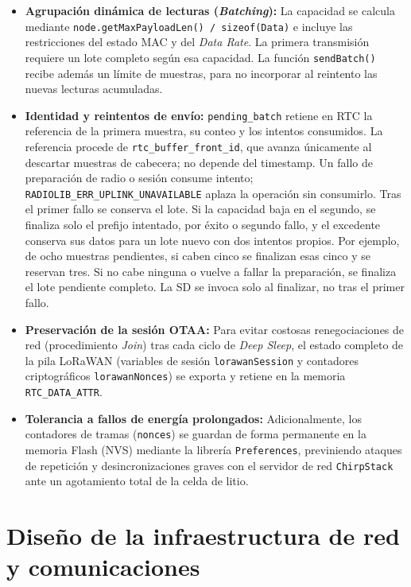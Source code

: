 \begin{itemize}
    \item \textbf{Agrupación dinámica de lecturas (\textit{Batching}):} La capacidad se calcula mediante \texttt{node.getMaxPayloadLen() / sizeof(Data)} e incluye las restricciones del estado MAC y del \textit{Data Rate}. La primera transmisión requiere un lote completo según esa capacidad. La función \texttt{sendBatch()} recibe además un límite de muestras, para no incorporar al reintento las nuevas lecturas acumuladas.
    \item \textbf{Identidad y reintentos de envío:} \texttt{pending\_batch} retiene en RTC la referencia de la primera muestra, su conteo y los intentos consumidos. La referencia procede de \texttt{rtc\_buffer\_front\_id}, que avanza únicamente al descartar muestras de cabecera; no depende del timestamp. Un fallo de preparación de radio o sesión consume intento; \texttt{RADIOLIB\_ERR\_UPLINK\_UNAVAILABLE} aplaza la operación sin consumirlo. Tras el primer fallo se conserva el lote. Si la capacidad baja en el segundo, se finaliza solo el prefijo intentado, por éxito o segundo fallo, y el excedente conserva sus datos para un lote nuevo con dos intentos propios. Por ejemplo, de ocho muestras pendientes, si caben cinco se finalizan esas cinco y se reservan tres. Si no cabe ninguna o vuelve a fallar la preparación, se finaliza el lote pendiente completo. La SD se invoca solo al finalizar, no tras el primer fallo.
    \item \textbf{Preservación de la sesión OTAA:} Para evitar costosas renegociaciones de red (procedimiento \textit{Join}) tras cada ciclo de \textit{Deep Sleep}, el estado completo de la pila LoRaWAN (variables de sesión \texttt{lorawanSession} y contadores criptográficos \texttt{lorawanNonces}) se exporta y retiene en la memoria \texttt{RTC\_DATA\_ATTR}. 
    \item \textbf{Tolerancia a fallos de energía prolongados:} Adicionalmente, los contadores de tramas (\texttt{nonces}) se guardan de forma permanente en la memoria Flash (NVS) mediante la librería \texttt{Preferences}, previniendo ataques de repetición y desincronizaciones graves con el servidor de red \texttt{ChirpStack} ante un agotamiento total de la celda de litio.
\end{itemize}


\section{Diseño de la infraestructura de red y comunicaciones}

